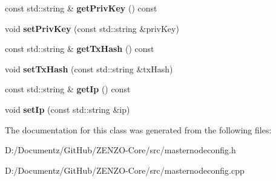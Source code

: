 \begin{DoxyCompactItemize}
\mbox{\label{class_c_masternode_config_1_1_c_masternode_entry_ab0e21a945e43940b659bf289f9280552}} 
const std\+::string \& {\bfseries get\+Priv\+Key} () const
\item 
\mbox{\label{class_c_masternode_config_1_1_c_masternode_entry_a991176f5739043dab17d262a42e7061b}} 
void {\bfseries set\+Priv\+Key} (const std\+::string \&priv\+Key)
\item 
\mbox{\label{class_c_masternode_config_1_1_c_masternode_entry_a08039c5a3271a278c64a706c4b53d29b}} 
const std\+::string \& {\bfseries get\+Tx\+Hash} () const
\item 
\mbox{\label{class_c_masternode_config_1_1_c_masternode_entry_a32224c906982e19d8b231ed7bc8d27bd}} 
void {\bfseries set\+Tx\+Hash} (const std\+::string \&tx\+Hash)
\item 
\mbox{\label{class_c_masternode_config_1_1_c_masternode_entry_a50b3672f986b569c83bf29e08f8165c8}} 
const std\+::string \& {\bfseries get\+Ip} () const
\item 
\mbox{\label{class_c_masternode_config_1_1_c_masternode_entry_a6dfa8be6875c2718ce05f701158cbbfd}} 
void {\bfseries set\+Ip} (const std\+::string \&ip)
\end{DoxyCompactItemize}


The documentation for this class was generated from the following files\+:\begin{DoxyCompactItemize}
\item 
D\+:/\+Documentz/\+Git\+Hub/\+Z\+E\+N\+Z\+O-\/\+Core/src/masternodeconfig.\+h\item 
D\+:/\+Documentz/\+Git\+Hub/\+Z\+E\+N\+Z\+O-\/\+Core/src/masternodeconfig.\+cpp\end{DoxyCompactItemize}
